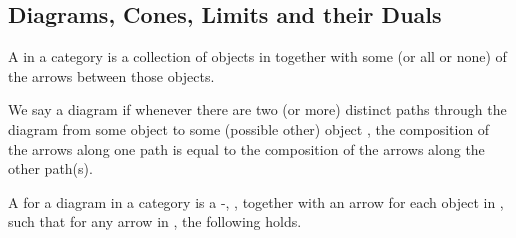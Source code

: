 \documentclass{seminar}
\newcommand{\NAT}{\textcolor{MathColor}{\ensuremath{\mathbb{N}}}}
\newcommand{\suc}{\tmi{succ}}
\newcommand{\CC}{\tm{\cal C}}
\newcommand{\CCC}{\tm{{\cal C}\,}}
\begin{document}
\begin{slide}








\section*{Diagrams, Cones, Limits and their Duals}

A  in a category \CCC is a collection of objects
in \CCC together with some
(or all or none) of the arrows between those objects.

We say a diagram  if whenever there are two
(or more) distinct
paths through the diagram from some object  to some (possible
other)
object , the composition of the arrows along one path is equal
to
the composition of the arrows along the other path(s).

\newpage

A  for a diagram  in a category \CCC is a
\CC-, , together with an arrow
 for each
object  in , such that for any arrow
 in , the following holds.\\


\end{slide}
\end{document}
